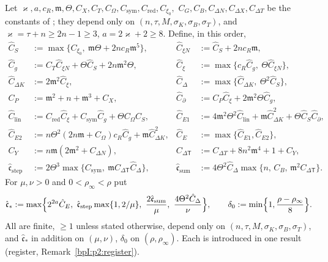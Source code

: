 \begin{definition}[Constants]\label{bpI:p2:constants}
Let $\varkappa,a,c_R,\mathfrak m,\Theta,C_X,C_T,C_\Omega,C_{\mathrm{sym}},C_{\mathrm{red}},C_{\xi_0},$ $C_G,C_B,C_{\Delta N},C_{\Delta X},C_{\Delta T}$ be the constants of
; they depend only on $(n,\tau,M,\sigma_K,\sigma_B,\sigma_T)$, and $\varkappa=\tau+n\ge2n-1\ge3$, $a=2\varkappa+2\ge8$. Define, in this order,
\begin{align*}
\hat C_S&:=\max\{C_{\xi_0},\ \mathfrak m\Theta+2nc_R\mathfrak m^5\}, & \hat C_{\xi N}&:=\hat C_S+2nc_R\mathfrak m,\\
\hat C_g&:=C_T\hat C_{\xi N}+\Theta\hat C_S+2n\mathfrak m^2\Theta, & \hat C_\xi&:=\max\{c_R\hat C_g,\ \Theta\hat C_{\xi N}\},\\
\hat C_{\Delta K}&:=2\mathfrak m^2\hat C_\xi, & \hat C_\Delta&:=\max\{\hat C_{\Delta K},\ \Theta^2\hat C_S\},\\
C_P&:=\mathfrak m^2+n+\mathfrak m^3+C_X, & \hat C_\partial&:=C_P\hat C_\xi+2\mathfrak m^2\Theta\hat C_g,\\
\hat C_{\mathrm{lin}}&:=C_{\mathrm{red}}\hat C_\xi+C_{\mathrm{sym}}\hat C_g+\Theta C_\Omega\hat C_S, &
\hat C_{E1}&:=4\mathfrak m^2\Theta^2\hat C_{\mathrm{lin}}+\mathfrak m\hat C_{\Delta K}^2+\Theta\hat C_S\hat C_\partial,\\
\hat C_{E2}&:=n\Theta^2(2n\mathfrak m+C_\Omega)c_R\hat C_g+\mathfrak m\hat C_{\Delta K}^2, & \hat C_E&:=\max\{\hat C_{E1},\hat C_{E2}\},\\
C_Y&:=n\mathfrak m(2\mathfrak m^2+C_{\Delta N}), & C_{\Delta\mathsf T}&:=C_{\Delta T}+8n^2\mathfrak m^4+1+C_Y,\\
\hat{\mathfrak c}_{\mathrm{step}}&:=2\Theta^3\max\{C_{\mathrm{sym}},\ \mathfrak mC_{\Delta\mathsf T}\hat C_\Delta\}, &
\hat{\mathfrak c}_{\mathrm{sum}}&:=4\Theta^2\hat C_\Delta\max\{n,\,C_B,\,\mathfrak m^2C_{\Delta\mathsf T}\}.
\end{align*}
For $\mu,\nu>0$ and $0<\rho_\infty<\rho$ put
\[
\hat{\mathfrak c}_*:=\max\Bigl\{2^{2a}\hat C_E,\ \hat{\mathfrak c}_{\mathrm{step}}\max\{1,2/\mu\},\ \frac{2\hat{\mathfrak c}_{\mathrm{sum}}}{\mu},\ \frac{4\Theta^2\hat C_\Delta}{\nu}\Bigr\},\qquad
\delta_0:=\min\Bigl\{1,\frac{\rho-\rho_\infty}{8}\Bigr\}.
\]
All are finite, $\ge1$ unless stated otherwise, depend only on $(n,\tau,M,\sigma_K,\sigma_B,\sigma_T)$, and $\hat{\mathfrak c}_*$ in addition on $(\mu,\nu)$,
$\delta_0$ on $(\rho,\rho_\infty)$. Each is introduced in one result (register, Remark~\ref{bpI:p2:register}).
\end{definition}

